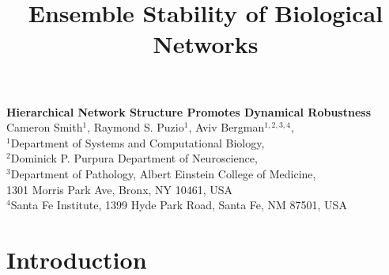 



\let\ref\autoref

\title{Ensemble Stability of Biological Networks}


\begin{center}
{\Large
\textbf{Hierarchical Network Structure Promotes Dynamical Robustness}
}
\\[.5cm]
Cameron Smith$^{1}$,
Raymond S. Puzio$^{1}$,
Aviv Bergman$^{1,2,3,4}$,
\\[.5cm]
$^1$Department of Systems and Computational Biology,\\
$^2$Dominick P. Purpura Department of Neuroscience,\\
$^3$Department of Pathology, Albert Einstein College of Medicine,\\
1301 Morris Park Ave, Bronx, NY 10461, USA\\
$^4$Santa Fe Institute, 1399 Hyde Park Road, Santa Fe, NM 87501, USA
\\[.5cm]
\end{center}

{\begin{quote} \bf

\end{quote}}


\section{Introduction}

